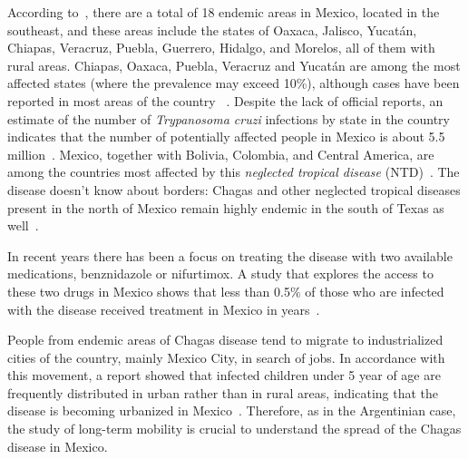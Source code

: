 According to~\cite{dumonteil1999update},
there are a total of 18 endemic areas in Mexico, located in the southeast, and
these areas include the states of Oaxaca, Jalisco, Yucatán, Chiapas, Veracruz,
Puebla, Guerrero, Hidalgo, and Morelos, all of them with rural areas.
Chiapas, Oaxaca, Puebla, Veracruz and Yucatán are among the most affected states (where the prevalence may exceed 10\%), although cases have been reported in most areas of the country
~\cite{cruz2006chagmex,dumonteil1999update}.
Despite the lack of official reports, an estimate of the number of \textit{Trypanosoma cruzi} infections by state in the country
indicates that the number of potentially
affected people in Mexico is about 5.5 million~\cite{carabarin2013chagas}.
Mexico, together with Bolivia, Colombia, and Central
America, are among the countries most affected by this
\textit{neglected tropical disease} (NTD)~\cite{hotez2013innovation}.
The disease doesn't know about borders:
Chagas and other neglected tropical diseases present in the north of Mexico remain highly endemic in the south of Texas as well~\cite{hotez2012texas}.

In recent years there has been a focus on treating the disease with two available
medications, benznidazole or nifurtimox. A study
that explores the access to these two drugs in Mexico
shows that less than 0.5\% of those who are infected with
the disease received treatment in Mexico in years~\cite{manne2013barriers}.


People from endemic areas of Chagas disease tend to migrate to industrialized cities of the country, mainly Mexico City, in search of jobs.
In accordance with this movement, a report showed
that infected children under 5 year of age are frequently distributed in urban
rather than in rural areas, indicating that the disease is becoming urbanized in
Mexico~\cite{guzman2001epidemiology}.
Therefore, as in the Argentinian case, the study of long-term mobility is crucial to understand the spread of the Chagas disease in Mexico.






